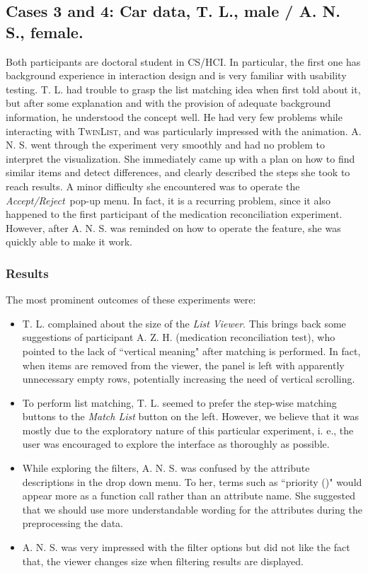 \documentclass{chi2009}
\newcommand{\TwinList}{\textsc{TwinList}}
\newcommand{\ListViewer}{\textit{List Viewer}}
\newcommand{\AcceptReject}{\textit{Accept/Reject}}
\begin{document}
\subsection{Cases 3 and 4: Car data, T. L., male / A. N. S., female.}

Both participants are doctoral student in CS/HCI. In particular, the first one has background experience in interaction design and is very familiar with usability testing. T. L. had trouble to grasp the list matching idea when first told about it, but after some explanation and with the provision of adequate background information, he understood the concept well. He had very few problems while interacting with \TwinList, and was particularly impressed with the animation. A. N. S. went through the experiment very smoothly and had no problem to interpret the visualization. She immediately came up with a plan on how to find similar items and detect differences, and clearly described the steps she took to reach results. A minor difficulty she encountered was to operate the \AcceptReject~pop-up menu. In fact, it is a recurring problem, since it also happened to the first participant of the medication reconciliation experiment. However, after A. N. S. was reminded on how to operate the feature, she was quickly able to make it work. 

\subsubsection{Results}
The most prominent outcomes of these experiments were:
\begin{itemize}
\item T. L. complained about the size of the \ListViewer. This brings back some suggestions of participant A. Z. H. (medication reconciliation test), who pointed to the lack of ``vertical meaning" after matching is performed. In fact, when items are removed from the viewer, the panel is left with apparently unnecessary empty rows, potentially increasing the need of vertical scrolling. 
\item To perform list matching, T. L. seemed to prefer the step-wise matching buttons to the \textit{Match List} button on the left. However, we believe that it was mostly due to the exploratory nature of this particular experiment, i. e., the user was encouraged to explore the interface as thoroughly as possible.
\item While exploring the filters, A. N. S. was confused by the attribute descriptions in the drop down menu. To her, terms such as ``priority ()" would appear more as a function call rather than an attribute name. She suggested that we should use more understandable wording for the attributes during the preprocessing the data.
\item A. N. S. was very impressed with the filter options but did not like the fact that, the viewer changes size when filtering results are displayed.
\end{itemize}
\end{document}

